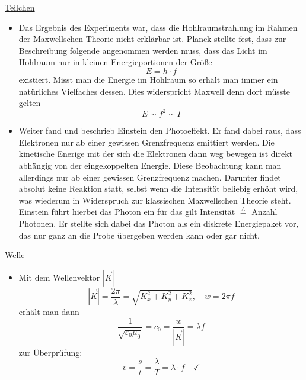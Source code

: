 	\newpage
	\begin{minipage}[t]{.5\textwidth}
	\underline{Teilchen}
		\begin{itemize}
			\item Das Ergebnis des Experiments war, dass die Hohlraumstrahlung im Rahmen der Maxwellschen Theorie nicht erklärbar ist. Planck stellte fest, dass zur Beschreibung folgende angenommen werden muss, dass das Licht im Hohlraum nur in kleinen Energieportionen der Größe
		\begin{equation}
			E = h \cdot f
		\end{equation}
		existiert. Misst man die Energie im Hohlraum so erhält man immer ein natürliches Vielfaches dessen. Dies widerspricht Maxwell denn dort müsste gelten
		\begin{equation}
			E \sim f^2 \sim I
		\end{equation}
		\item Weiter fand und beschrieb Einstein den Photoeffekt. Er fand dabei raus, dass Elektronen nur ab einer gewissen Grenzfrequenz emittiert werden. Die kinetische Enerige mit der sich die Elektronen dann weg bewegen ist direkt abhängig von der eingekoppelten Energie. Diese Beobachtung kann man allerdings nur ab einer gewissen Grenzfrequenz machen. Darunter findet absolut keine Reaktion statt, selbst wenn die Intensität beliebig erhöht wird, was wiederum in Widerspruch zur klassischen Maxwellschen Theorie steht. Einstein führt hierbei das Photon ein für das gilt Intensität $\overset{\wedge}{=}$ Anzahl Photonen. Er stellte sich dabei das Photon als ein diskrete Energiepaket vor, das nur ganz an die Probe übergeben werden kann oder gar nicht.
		\end{itemize}
	\end{minipage}
	\begin{minipage}[t]{.5\textwidth}
	\underline{Welle}
		\begin{itemize}
			\item Mit dem Wellenvektor $|\vec{K}|$
			\begin{equation}
				|\vec{K}| = \frac{2 \pi}{\lambda} = \sqrt{K_x^2 + K_y^2 + K_z^2}, \quad w = 2\pi f
			\end{equation}
			erhält man dann 
			\begin{equation}
				\frac{1}{\sqrt{\varepsilon_0 \mu_0}} = c_0 = \frac{w}{|\vec{K}|} = \lambda f 
			\end{equation}\label{eq:c_a}
			zur Überprüfung:
			\begin{equation}
				v = \frac{s}{t} = \frac{\lambda}{T} = \lambda \cdot f\quad \checkmark
			\end{equation}
		\end{itemize}
	\end{minipage}
	
